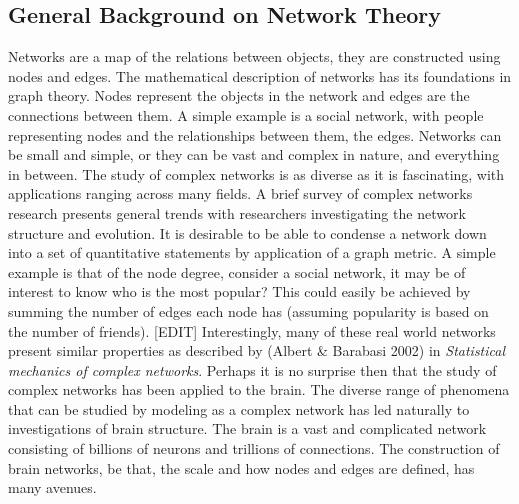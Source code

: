 \documentclass[11pt]{article}
\begin{document}
\subsection{General Background on Network Theory}
Networks are a map of the relations between objects, they are constructed using nodes and edges. The mathematical description of networks has its foundations in graph theory. Nodes represent the objects in the network and edges are the connections between them. A simple example is a social network, with people representing nodes and the relationships between them, the edges. Networks can be small and simple, or they can be vast and complex in nature, and everything in between. The study of complex networks is as diverse as it is fascinating, with applications ranging across many fields. A brief survey of complex networks research presents general trends with researchers investigating the network structure and evolution. It is desirable to be able to condense a network down into a set of quantitative statements by application of a graph metric. A simple example is that of the node degree, consider a social network, it may be of interest to know who is the most popular? This could easily be achieved by summing the number of edges each node has (assuming popularity is based on the number of friends). [EDIT] Interestingly, many of these real world networks present similar properties as described by (Albert \& Barabasi 2002) in \emph{Statistical mechanics of complex networks}. Perhaps it is no surprise then that the study of complex networks has been applied to the brain. The diverse range of phenomena that can be studied by modeling as a complex network has led naturally to investigations of brain structure. The brain is a vast and complicated network consisting of billions of neurons and trillions of connections. The construction of brain networks, be that, the scale and how nodes and edges are defined, has many avenues.
\end{document}
